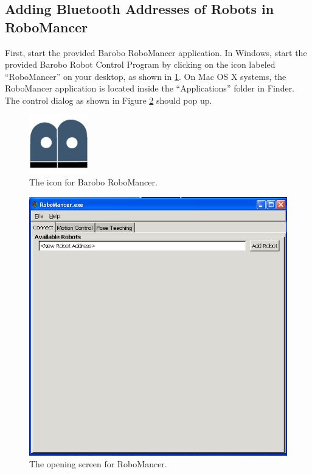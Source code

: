 \documentclass{article}
\begin{document}
\subsection{\label{sec:pairing_robotcontroller} Adding Bluetooth Addresses of Robots in RoboMancer}
First, start the provided Barobo RoboMancer application.
In Windows, start the provided Barobo Robot Control Program by clicking on the icon labeled 
``RoboMancer'' on your desktop, as shown in \ref{fig:barobo_icon.png}. On Mac OS X systems,
the RoboMancer application is located inside the ``Applications'' folder in Finder. The 
control dialog as shown in Figure \ref{fig:shot1.png} should pop up.
\begin{figure}[H]
\begin{center}
\includegraphics[width=1in]{images/barobo_icon.png}
\end{center}
\caption{\label{fig:barobo_icon.png} The icon for Barobo RoboMancer.}
\end{figure}

\begin{figure}[H]
\begin{center}
\includegraphics[width=4.5in]{images/robomancer_screenshot1.png}
\end{center}
\caption{\label{fig:shot1.png} The opening screen for RoboMancer.}
\end{figure}
\end{document}
